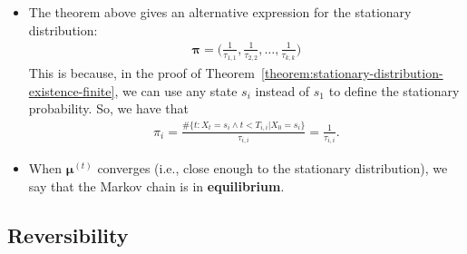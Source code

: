 \documentclass[10pt]{article}
\newcommand{\mrm}[1]{\mathrm{#1}}
\newcommand{\ves}[1]{\boldsymbol{#1}}
\begin{document}
\begin{itemize}
  \begin{proof}
    Suppose there are two stationary distributions $\ves{\pi}$ and $\ves{\pi}'$. We can start a Markov chain simulation with $X_0$ being distributed according to $\ves{\mu}^{(0)} = \ves{\pi}'$. By the last theorem, we have that
    \begin{align*}
        0 
        = \lim_{t \rightarrow \infty} d_{\mrm{TV}}(\ves{\mu}^{(t)}, \ves{\pi})
        = \lim_{t \rightarrow \infty} d_{\mrm{TV}}(\ves{\pi}', \ves{\pi})
        = d_{\mrm{TV}}(\ves{\pi}', \ves{\pi}),
    \end{align*}        
    which means that $\ves{\pi}' = \ves{\pi}$.
  \end{proof}

  \item The theorem above gives an alternative expression for the stationary distribution:
  \begin{align*}
      \ves{\pi} = \bigg( \frac{1}{\tau_{1,1}}, \frac{1}{\tau_{2,2}}, \dotsc, \frac{1}{\tau_{k,k}} \bigg)
  \end{align*}
  This is because, in the proof of Theorem~\ref{theorem:stationary-distribution-existence-finite}, we can use any state $s_i$ instead of $s_1$ to define the stationary probability. So, we have that
  \begin{align*}
      \pi_i = \frac{\#\{t: X_t = s_i \wedge t < T_{i,i}| X_0 = s_i\}}{\tau_{i,i}} = \frac{1}{\tau_{i,i}}.
  \end{align*}

  \item When $\ves{\mu}^{(t)}$ converges (i.e., close enough to the stationary distribution), we say that the Markov chain is in {\bf equilibrium}.
\end{itemize}

\subsection{Reversibility}
\end{document}
